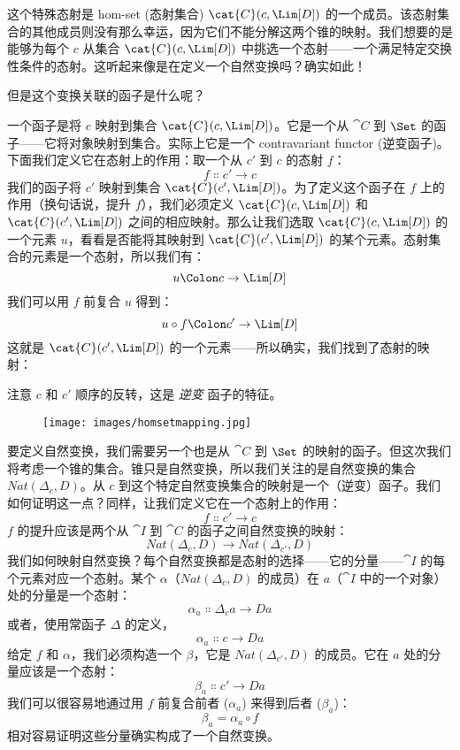 这个特殊态射是 hom-set (态射集合) $\cat{C}(c, \Lim[D])$ 的一个成员。该态射集合的其他成员则没有那么幸运，因为它们不能分解这两个锥的映射。我们想要的是能够为每个 $c$ 从集合 $\cat{C}(c, \Lim[D])$ 中挑选一个态射——一个满足特定交换性条件的态射。这听起来像是在定义一个自然变换吗？确实如此！

但是这个变换关联的函子是什么呢？

一个函子是将 $c$ 映射到集合 $\cat{C}(c, \Lim[D])$。它是一个从 $\cat{C}$ 到 $\Set$ 的函子——它将对象映射到集合。实际上它是一个 contravariant functor (逆变函子)。下面我们定义它在态射上的作用：取一个从 $c'$ 到 $c$ 的态射 $f$：
\[f \Colon c' \to c\]
我们的函子将 $c'$ 映射到集合 $\cat{C}(c', \Lim[D])$。为了定义这个函子在 $f$ 上的作用（换句话说，提升 $f$），我们必须定义 $\cat{C}(c, \Lim[D])$ 和 $\cat{C}(c', \Lim[D])$ 之间的相应映射。那么让我们选取 $\cat{C}(c, \Lim[D])$ 的一个元素 $u$，看看是否能将其映射到 $\cat{C}(c', \Lim[D])$ 的某个元素。态射集合的元素是一个态射，所以我们有：
\[u \Colon c \to \Lim[D]\]
我们可以用 $f$ 前复合 $u$ 得到：
\[u \circ f \Colon c' \to \Lim[D]\]
这就是 $\cat{C}(c', \Lim[D])$ 的一个元素——所以确实，我们找到了态射的映射：

注意 $c$ 和 $c'$ 顺序的反转，这是 \emph{逆变} 函子的特征。

\begin{figure}[H]
  \centering
  \texttt{[image: images/homsetmapping.jpg]}
\end{figure}

\noindent
要定义自然变换，我们需要另一个也是从 $\cat{C}$ 到 $\Set$ 的映射的函子。但这次我们将考虑一个锥的集合。锥只是自然变换，所以我们关注的是自然变换的集合 $\mathit{Nat}(\Delta_c, D)$。从 $c$ 到这个特定自然变换集合的映射是一个（逆变）函子。我们如何证明这一点？同样，让我们定义它在一个态射上的作用：
\[f \Colon c' \to c\]
$f$ 的提升应该是两个从 $\cat{I}$ 到 $\cat{C}$ 的函子之间自然变换的映射：
\[\mathit{Nat}(\Delta_c, D) \to \mathit{Nat}(\Delta_{c'}, D)\]
我们如何映射自然变换？每个自然变换都是态射的选择——它的分量——$\cat{I}$ 的每个元素对应一个态射。某个 $\alpha$（$\mathit{Nat}(\Delta_c, D)$ 的成员）在 $a$（$\cat{I}$ 中的一个对象）处的分量是一个态射：
\[\alpha_a \Colon \Delta_c a \to D a\]
或者，使用常函子 $\Delta$ 的定义，
\[\alpha_a \Colon c \to D a\]
给定 $f$ 和 $\alpha$，我们必须构造一个 $\beta$，它是 $\mathit{Nat}(\Delta_{c'}, D)$ 的成员。它在 $a$ 处的分量应该是一个态射：
\[\beta_a \Colon c' \to D a\]
我们可以很容易地通过用 $f$ 前复合前者 ($\alpha_a$) 来得到后者 ($\beta_a$)：
\[\beta_a = \alpha_a \circ f\]
相对容易证明这些分量确实构成了一个自然变换。

